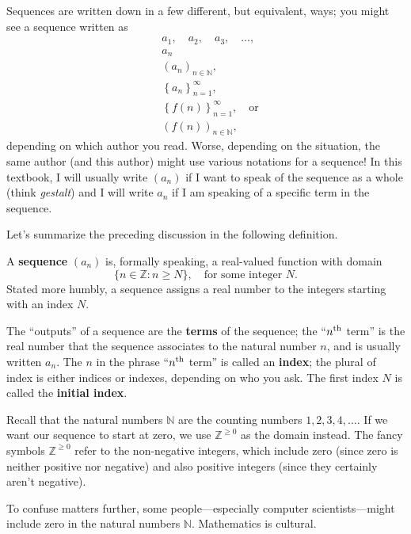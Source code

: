 \documentclass{ximera}
\newcommand{\defnword}[1]{\textbf{#1}}
\newcommand{\Z}{\mathbb{Z}}
\newcommand{\N}{\mathbb{N}}
\newcommand{\nth}{\mbox{\scriptsize th}}
\renewcommand{\index}[1]{}
\begin{document}
Sequences are written down in a few different, but equivalent,
ways; you might see a sequence written as
\begin{align*}
  & a_1,\quad a_2, \quad a_3, \quad\ldots, \\
  & a_n \\
  & \left(a_n\right)_{n \in \N}, \\
  & \left\{a_n\right\}_{n=1}^\infty, \\
  & \left\{f(n)\right\}_{n=1}^\infty, \quad \mbox{or} \\
  & \left(f(n)\right)_{n \in \N},
\end{align*}
depending on which author you read.  Worse, depending on the
situation, the same author (and this author) might use various
notations for a sequence!  In this textbook, I will usually write
$(a_n)$ if I want to speak of the sequence as a whole (think
\textit{gestalt}) and I will write $a_n$ if I am speaking of a
specific term in the sequence.

Let's summarize the preceding discussion in the following definition.
\begin{definition}\index{sequence} A \defnword{sequence}
  $(a_n)$ is, formally speaking, a real-valued function with domain
  \[
  \{ n \in \Z : n \geq N \},\quad \mbox{for some integer $N$.}
  \]
  Stated more humbly, a sequence assigns a real number to the
  integers starting with an index $N$.

  The ``outputs'' of a sequence are the \defnword{terms} of the
  sequence; the ``$n^{\nth}$ term'' is the real number that the
  sequence associates to the natural number $n$, and is usually
  written $a_n$. \index{sequence!term} The $n$ in the phrase
  ``$n^{\nth}$ term'' is called an
  \defnword{index}\index{sequence!index}; the plural of index is
  either indices or indexes, depending on who you ask.  The first
  index $N$ is called the \defnword{initial
    index}\index{sequence!index!initial}.
\end{definition} 

\begin{observation}
  Recall that the natural numbers $\N$ are the counting numbers $1, 2,
  3, 4, \ldots$.  If we want our sequence to start at zero, we use
  $\Z^{\ge 0}$ as the domain instead.  The fancy symbols $\Z^{\ge 0}$
  refer to the non-negative integers, which include zero (since zero
  is neither positive nor negative) and also positive integers (since
  they certainly aren't negative).

  To confuse matters further, some people---especially computer
  scientists---might include zero in the natural numbers $\N$.
  Mathematics is cultural.
\end{observation}
\end{document}
